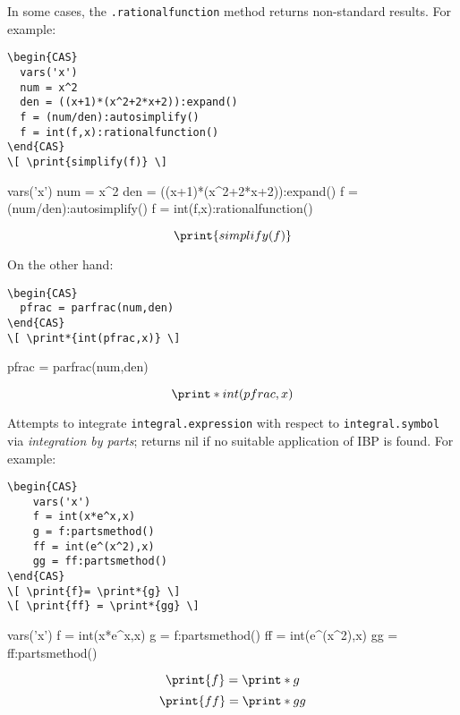 In some cases, the \texttt{.rationalfunction} method returns non-standard results. For example:
\begin{codebox}
    \begin{verbatim}
\begin{CAS}
  vars('x')
  num = x^2
  den = ((x+1)*(x^2+2*x+2)):expand()
  f = (num/den):autosimplify()
  f = int(f,x):rationalfunction()
\end{CAS}
\[ \print{simplify(f)} \]
\end{verbatim}
\tcblower
\begin{CAS}
  vars('x')
  num = x^2
  den = ((x+1)*(x^2+2*x+2)):expand()
  f = (num/den):autosimplify()
  f = int(f,x):rationalfunction()
\end{CAS}
\[ \print{simplify(f)} \]
\end{codebox}
On the other hand:
\begin{codebox}
    \begin{verbatim}
\begin{CAS}
  pfrac = parfrac(num,den)
\end{CAS}
\[ \print*{int(pfrac,x)} \]
\end{verbatim}
\tcblower
\begin{CAS}
    pfrac = parfrac(num,den)
  \end{CAS}
\[ \print*{int(pfrac,x)} \]
\end{codebox}


Attempts to integrate \texttt{integral.expression} with respect to \texttt{integral.symbol} via \emph{integration by parts}; returns nil if no suitable application of IBP is found. For example:

\begin{codebox}
    \begin{verbatim}
\begin{CAS}
    vars('x')
    f = int(x*e^x,x)
    g = f:partsmethod()
    ff = int(e^(x^2),x)
    gg = ff:partsmethod()
\end{CAS}
\[ \print{f}= \print*{g} \]
\[ \print{ff} = \print*{gg} \]
\end{verbatim}
\tcblower
\begin{CAS}
    vars('x')
    f = int(x*e^x,x)
    g = f:partsmethod()
    ff = int(e^(x^2),x)
    gg = ff:partsmethod()
\end{CAS}
\[ \print{f}= \print*{g} \]
\[ \print{ff} = \print*{gg} \]
\end{codebox}


